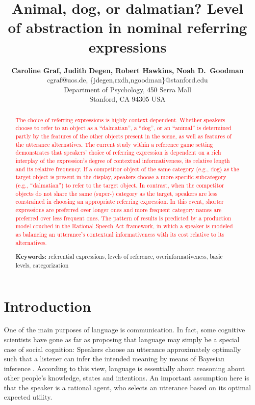 \documentclass[10pt,letterpaper]{article}
\title{Animal, dog, or dalmatian? Level of abstraction in nominal referring expressions}
\author{{\large \bf Caroline Graf, Judith Degen, Robert Hawkins, Noah D.~Goodman} \\
  cgraf@uos.de, \{jdegen,rxdh,ngoodman\}@stanford.edu\\
  Department of Psychology, 450 Serra Mall \\
  Stanford, CA 94305 USA}
\newcommand{\red}[1]{\textcolor{Red}{#1}}
\begin{document}
\maketitle


\begin{abstract}

\red{The choice of referring expressions is highly context dependent. Whether speakers choose to refer to an object as a ``dalmatian'', a ``dog'', or an ``animal'' is determined partly by the features of the other objects present in the scene, as well as features of the utterance alternatives. The current study within a reference game setting demonstrates that speakers' choice of referring expression is dependent on a rich interplay of the expression's degree of contextual informativeness, its relative length and its relative frequency. If a competitor object of the same category (e.g., dog) as the target object is present in the display, speakers choose a more specific subcategory (e.g., ``dalmatian'') to refer to the target object. In contrast, when the competitor objects do not share the same (super-) category as the target, speakers are less constrained in choosing an appropriate referring expression. In this event, shorter expressions are preferred over longer ones and more frequent category names are preferred over less frequent ones. The pattern of results is predicted by a production model couched in the Rational Speech Act framework, in which a speaker is modeled as balancing an utterance's contextual informativeness with its cost relative to its alternatives.}

\textbf{Keywords:} 
referential expressions, levels of reference, overinformativeness, basic levels, categorization
\end{abstract}

\section{\bf Introduction}

One of the main purposes of language is communication. In fact, some cognitive scientists have gone as far as proposing that language may simply be a special case of social cognition: Speakers choose an utterance approximately optimally such that a listener can infer the intended meaning by means of Bayesian inference \cite{frank2012}. According to this view, language is essentially about reasoning about other people's knowledge, states and intentions. An important assumption here is that the speaker is a rational agent, who selects an utterance based on its optimal expected utility. 
\end{document}
